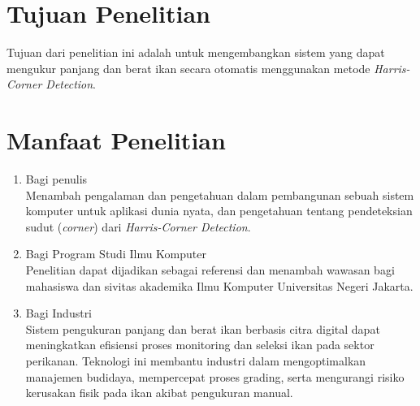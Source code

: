\section{Tujuan Penelitian}
Tujuan dari penelitian ini adalah untuk mengembangkan sistem yang dapat mengukur panjang dan berat ikan secara otomatis menggunakan metode \emph{Harris-Corner Detection}.

\section{Manfaat Penelitian}
\begin{enumerate}
    \item Bagi penulis\\
    Menambah pengalaman dan pengetahuan dalam pembangunan sebuah sistem komputer untuk aplikasi dunia nyata, dan pengetahuan tentang pendeteksian sudut (\emph{corner}) dari \emph{Harris-Corner Detection}.
    
    \item Bagi Program Studi Ilmu Komputer\\
    Penelitian dapat dijadikan sebagai referensi dan menambah wawasan bagi mahasiswa dan sivitas akademika Ilmu Komputer Universitas Negeri Jakarta.

    \item Bagi Industri\\
    Sistem pengukuran panjang dan berat ikan berbasis citra digital dapat meningkatkan efisiensi proses monitoring dan seleksi ikan pada sektor perikanan. Teknologi ini membantu industri dalam mengoptimalkan manajemen budidaya, mempercepat proses grading, serta mengurangi risiko kerusakan fisik pada ikan akibat pengukuran manual.
\end{enumerate}

\begin{comment}

\end{comment}

